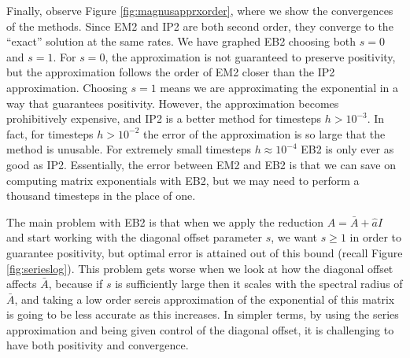 Finally, observe Figure \ref{fig:magnusapprxorder}, where we show the convergences of the methods.
Since EM2 and IP2 are both second order, they converge to the ``exact'' solution at the same rates.
We have graphed EB2 choosing both $s=0$ and $s=1$. For $s=0$, the approximation is not guaranteed to preserve positivity,
but the approximation follows the order of EM2 closer than the IP2 approximation.
Choosing $s=1$ means we are approximating the exponential in a way that guarantees positivity.
However, the approximation becomes prohibitively expensive, and IP2 is a better method for timesteps $h > 10^{-3}$.
In fact, for timesteps $h > 10^{-2}$ the error of the approximation is so large that the method is unusable. 
For extremely small timesteps $h \approx 10^{-4}$ EB2 is only ever as good as IP2.
Essentially, the error between EM2 and EB2 is that we can save on computing matrix exponentials with EB2,
but we may need to perform a thousand timesteps in the place of one.

The main problem with EB2 is that when we apply the reduction $A = \bar{A} + \hat{a}I$ and start working with the diagonal offset parameter $s$,
we want $s \ge 1$ in order to guarantee positivity, but optimal error is attained out of this bound (recall Figure \ref{fig:serieslog}).
This problem gets worse when we look at how the diagonal offset affects $\bar{A}$, because if $s$ is sufficiently large then it scales with the spectral radius of $\bar{A}$,
and taking a low order sereis approximation of the exponential of this matrix is going to be less accurate as this increases.
In simpler terms, by using the series approximation and being given control of the diagonal offset, it is challenging to have both positivity and convergence.



